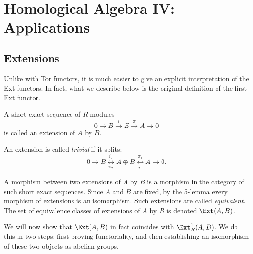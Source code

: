 \chapter{Homological Algebra IV: Applications \texorpdfstring{\ucmark}{}}


\section{Extensions}

Unlike with Tor functors, it is much easier to give an explicit interpretation of the Ext functors. In fact, what we describe below is the original definition of the first Ext functor.

\begin{defn}[Extension]
    A short exact sequence of $R$-modules 
    \[0\to B\overset{i}{\to} E\overset{\pi}{\to} A\to 0\] 
    is called an extension of $A$ by $B$.

    An extension is called \emph{trivial} if it splits:
    \[0\to B
    \underset{\pi_2}{\overset{i_2}{\leftrightarrow}}
    A\oplus B
    \underset{i_1}{\overset{\pi_1}{\leftrightarrow}}
    A\to 0.
    \]

    A morphism between two extensions of $A$ by $B$ is a morphism in the category of such short exact sequences. Since $A$ and $B$ are fixed, by the 5-lemma every morphism of extensions is an isomorphism. Such extensions are called \emph{equivalent}. The set of equivalence classes of extensions of $A$ by $B$ is denoted $\Ext(A,B)$.
\end{defn}

We will now show that $\Ext(A,B)$ in fact coincides with $\Ext^1_R(A,B)$. We do this in two steps: first proving functoriality, and then establishing an isomorphism of these two objects as abelian groups.

